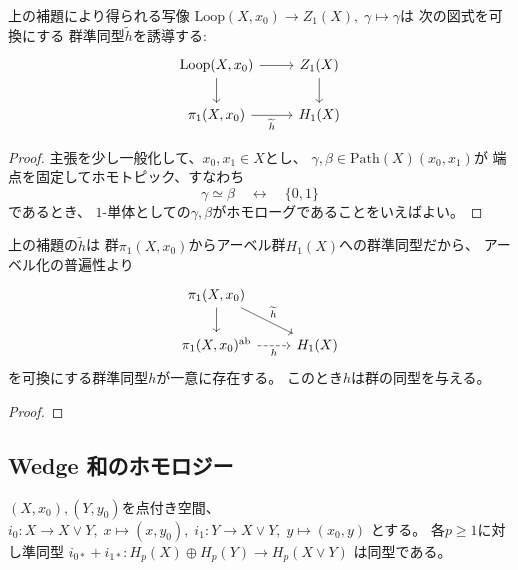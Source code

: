 \documentclass[report]{jlreq}
\begin{document}
\begin{lemma}
    上の補題により得られる写像
    $\mathrm{Loop}(X, x_0) \to Z_1(X), \; \gamma \mapsto \gamma$は
    次の図式を可換にする
    群準同型$\widetilde{h}$を誘導する:
    \begin{equation}
        \begin{tikzcd}
            \mathrm{Loop}(X, x_0) \ar{d} \ar{r}
                & Z_1(X) \ar{d} \\
            \pi_1(X, x_0) \ar{r}[swap]{\widetilde{h}}
                & H_1(X)
        \end{tikzcd}
    \end{equation}
\end{lemma}

\begin{proof}
    主張を少し一般化して、$x_0, x_1 \in X$とし、
    $\gamma, \beta \in \mathrm{Path}(X)(x_0, x_1)$が
    端点を固定してホモトピック、すなわち
    \begin{equation}
        \gamma \simeq \beta \quad \rel \quad \{ 0, 1 \}
    \end{equation}
    であるとき、
    $1$-単体としての$\gamma, \beta$がホモローグであることをいえばよい。
    \TODO{}
\end{proof}

\begin{theorem}[Hurewicz]
    上の補題の$\widetilde{h}$は
    群$\pi_1(X, x_0)$からアーベル群$H_1(X)$への群準同型だから、
    アーベル化の普遍性より
    \begin{equation}
        \begin{tikzcd}
            \pi_1(X, x_0) \ar{d} \ar{rd}{\widetilde{h}} \\
            \pi_1(X, x_0)^{\mathrm{ab}}
                \ar[dashed]{r}[swap]{h}
                & H_1(X)
        \end{tikzcd}
    \end{equation}
    を可換にする群準同型$h$が一意に存在する。
    このとき$h$は群の同型を与える。
\end{theorem}

\begin{proof}
    \TODO{}
\end{proof}


\subsection{Wedge 和のホモロジー}

\begin{proposition}
    $(X, x_0), (Y, y_0)$を点付き空間、
    $i_0 \colon X \to X \vee Y, \; x \mapsto (x, y_0), \;
        i_1 \colon Y \to X \vee Y, \; y \mapsto (x_0, y)$
    とする。
    各$p \ge 1$に対し準同型
    $i_{0*} + i_{1*} \colon H_p(X) \oplus H_p(Y) \to H_p(X \vee Y)$
    は同型である。
\end{proposition}
\end{document}

